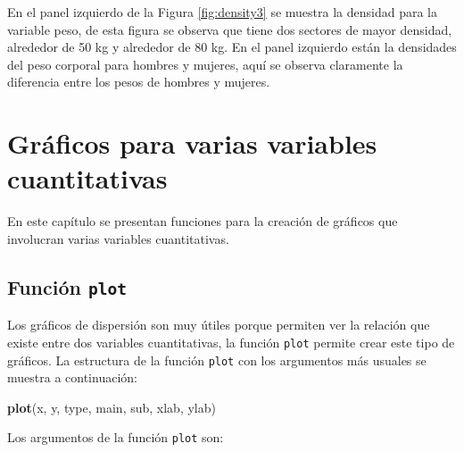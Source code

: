 \documentclass[10pt,]{krantz}
\makeatletter
\newenvironment{Shaded}{\begin{snugshade}}{\end{snugshade}}
\newcommand{\KeywordTok}[1]{\textcolor[rgb]{0.13,0.29,0.53}{\textbf{#1}}}
\newcommand{\NormalTok}[1]{#1}
\newenvironment{kframe}{%
\medskip{}
\setlength{\fboxsep}{.8em}
 \def\at@end@of@kframe{}%
 \ifinner\ifhmode%
  \def\at@end@of@kframe{\end{minipage}}%
  \begin{minipage}{\columnwidth}%
 \fi\fi%
 \def\FrameCommand##1{\hskip\@totalleftmargin \hskip-\fboxsep
 \colorbox{shadecolor}{##1}\hskip-\fboxsep
     \hskip-\linewidth \hskip-\@totalleftmargin \hskip\columnwidth}%
 \MakeFramed {\advance\hsize-\width
   \@totalleftmargin\z@ \linewidth\hsize
   \@setminipage}}%
 {\par\unskip\endMakeFramed%
 \at@end@of@kframe}
\renewenvironment{Shaded}{\begin{kframe}}{\end{kframe}}
\makeatother
\begin{document}
En el panel izquierdo de la Figura \ref{fig:density3} se muestra la
densidad para la variable peso, de esta figura se observa que tiene dos
sectores de mayor densidad, alrededor de 50 kg y alrededor de 80 kg. En
el panel izquierdo están la densidades del peso corporal para hombres y
mujeres, aquí se observa claramente la diferencia entre los pesos de
hombres y mujeres.

\chapter{Gráficos para varias variables
cuantitativas}\label{graficos-para-varias-variables-cuantitativas}

En este capítulo se presentan funciones para la creación de gráficos que
involucran varias variables cuantitativas.

\section{\texorpdfstring{Función \texttt{plot} 
}{Función plot  }}\label{funcion-plot}

Los gráficos de dispersión son muy útiles porque permiten ver la
relación que existe entre dos variables cuantitativas, la función
\texttt{plot} permite crear este tipo de gráficos. La estructura de la
función \texttt{plot} con los argumentos más usuales se muestra a
continuación:

\begin{Shaded}
\begin{Highlighting}[]
\KeywordTok{plot}\NormalTok{(x, y, type, main, sub, xlab, ylab)}
\end{Highlighting}
\end{Shaded}

Los argumentos de la función \texttt{plot} son:
\end{document}
